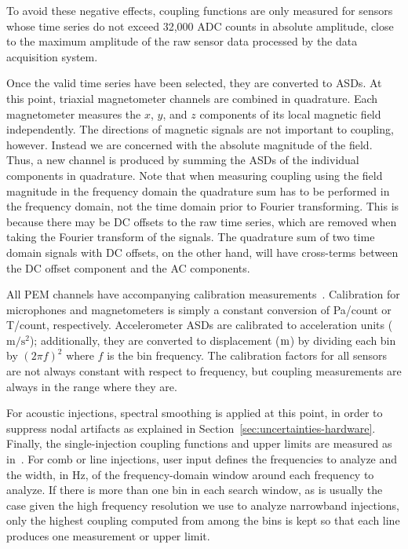 To avoid these negative effects, coupling functions are only measured for sensors whose time series do not exceed 32,000 \ac{ADC} counts in absolute amplitude, close to the maximum amplitude of the raw sensor data processed by the data acquisition system.

Once the valid time series have been selected, they are converted to \acp{ASD}.
At this point, triaxial magnetometer channels are combined in quadrature.
Each magnetometer measures the $x$, $y$, and $z$ components of its local magnetic field independently.
The directions of magnetic signals are not important to coupling, however.
Instead we are concerned with the absolute magnitude of the field.
Thus, a new channel is produced by summing the ASDs of the individual components in quadrature.
Note that when measuring coupling using the field magnitude in the frequency domain the quadrature sum has to be performed in the frequency domain, not the time domain prior to Fourier transforming.
This is because there may be DC offsets to the raw time series, which are removed when taking the Fourier transform of the signals.
The quadrature sum of two time domain signals with DC offsets, on the other hand, will have cross-terms between the DC offset component and the AC components.

All \ac{PEM} channels have accompanying calibration measurements~\citep{PEM_website}. Calibration for microphones and magnetometers is simply a constant conversion of Pa/count or T/count, respectively.
Accelerometer \acp{ASD} are calibrated to acceleration units ($\mathrm{m/s^2}$); additionally, they are converted to displacement ($\meter$) by dividing each bin by $(2\pi f)^2$ where $f$ is the bin frequency.
The calibration factors for all sensors are not always constant with respect to frequency, but coupling measurements are always in the range where they are.

For acoustic injections, spectral smoothing is applied at this point, in order to suppress nodal artifacts as explained in Section~\ref{sec:uncertainties-hardware}.
Finally, the single-injection coupling functions and upper limits are measured as in~.
For comb or line injections, user input defines the frequencies to analyze and the width, in Hz, of the frequency-domain window around each frequency to analyze.
If there is more than one bin in each search window, as is usually the case given the high frequency resolution we use to analyze narrowband injections, only the highest coupling computed from among the bins is kept so that each line produces one measurement or upper limit.


